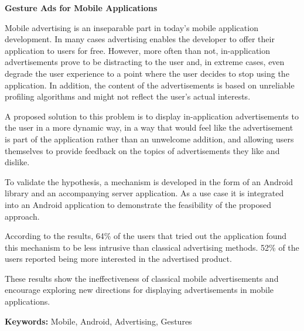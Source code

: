 \begin{abstracts}

\textbf{Gesture Ads for Mobile Applications}

Mobile advertising is an inseparable part in today's mobile application development. In many cases advertising enables the developer to offer their application to users for free. However, more often than not, in-application advertisements prove to be distracting to the user and, in extreme cases, even degrade the user experience to a point where the user decides to stop using the application. In addition, the content of the advertisements is based on unreliable profiling algorithms and might not reflect the user's actual interests.

A proposed solution to this problem is to display in-application advertisements to the user in a more dynamic way, in a way that would feel like the advertisement is part of the application rather than an unwelcome addition, and allowing users themselves to provide feedback on the topics of advertisements they like and dislike.

To validate the hypothesis, a mechanism is developed in the form of an Android library and an accompanying server application. As a use case it is integrated into an Android application to demonstrate the feasibility of the proposed approach.

According to the results, 64\% of the users that tried out the application found this mechanism to be less intrusive than classical advertising methods. 52\% of the users reported being more interested in the advertised product.

These results show the ineffectiveness of classical mobile advertisements and encourage exploring new directions for displaying advertisements in mobile applications.

\bigskip

\textbf{Keywords:} Mobile, Android, Advertising, Gestures

\end{abstracts}